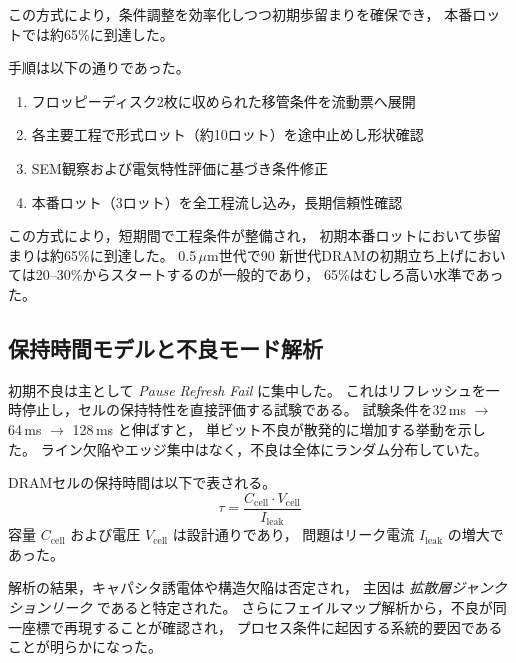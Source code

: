 \documentclass[conference]{IEEEtran}
\begin{document}
この方式により，条件調整を効率化しつつ初期歩留まりを確保でき，
本番ロットでは約65\%に到達した。

手順は以下の通りであった。
\begin{enumerate}
  \item フロッピーディスク2枚に収められた移管条件を流動票へ展開
  \item 各主要工程で形式ロット（約10ロット）を途中止めし形状確認
  \item SEM観察および電気特性評価に基づき条件修正
  \item 本番ロット（3ロット）を全工程流し込み，長期信頼性確認
\end{enumerate}

この方式により，短期間で工程条件が整備され，
初期本番ロットにおいて歩留まりは約65\%に到達した。
0.5\,$\mu$m世代で90%
新世代DRAMの初期立ち上げにおいては20–30\%からスタートするのが一般的であり，
65\%はむしろ高い水準であった。

\subsection{保持時間モデルと不良モード解析}
初期不良は主として \emph{Pause Refresh Fail} に集中した。
これはリフレッシュを一時停止し，セルの保持特性を直接評価する試験である。
試験条件を32\,ms $\rightarrow$ 64\,ms $\rightarrow$ 128\,ms と伸ばすと，
単ビット不良が散発的に増加する挙動を示した。
ライン欠陥やエッジ集中はなく，不良は全体にランダム分布していた。

DRAMセルの保持時間は以下で表される。
\begin{equation}
\tau = \frac{C_{\mathrm{cell}} \cdot V_{\mathrm{cell}}}{I_{\mathrm{leak}}}
\end{equation}
容量 $C_{\mathrm{cell}}$ および電圧 $V_{\mathrm{cell}}$ は設計通りであり，
問題はリーク電流 $I_{\mathrm{leak}}$ の増大であった。

解析の結果，キャパシタ誘電体や構造欠陥は否定され，
主因は \emph{拡散層ジャンクションリーク} であると特定された。
さらにフェイルマップ解析から，不良が同一座標で再現することが確認され，
プロセス条件に起因する系統的要因であることが明らかになった。
\end{document}
